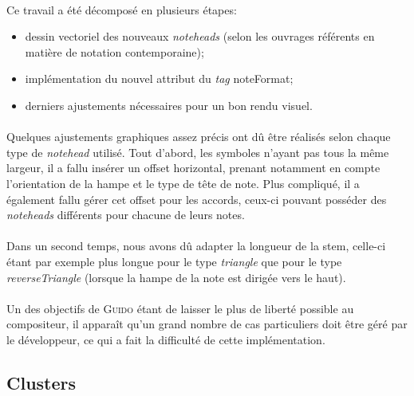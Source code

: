 \documentclass[a4paper,10pt,twocolumn]{article}
\newenvironment{code}
  {\fontfamily{pnc}\selectfont}{}
\begin{document}
\paragraph{}
Ce travail a été décomposé en plusieurs étapes:
\begin{itemize}
    \item dessin vectoriel des nouveaux \emph{noteheads} (selon les ouvrages référents en matière de notation contemporaine);
    \item implémentation du nouvel attribut du \emph{tag} \begin{code}noteFormat\end{code};
    \item derniers ajustements nécessaires pour un bon rendu visuel.
\end{itemize}

\paragraph{}
Quelques ajustements graphiques assez précis ont dû être réalisés selon chaque type de \emph{notehead} utilisé. Tout d'abord, les symboles n'ayant pas tous la même largeur, il a fallu insérer un offset horizontal, prenant notamment en compte l'orientation de la hampe et le type de tête de note. Plus compliqué, il a également fallu gérer cet offset pour les accords, ceux-ci pouvant posséder des \emph{noteheads} différents pour chacune de leurs notes.

\paragraph{}
Dans un second temps, nous avons dû adapter la longueur de la stem, celle-ci étant par exemple plus longue pour le type \emph{triangle} que pour le type \emph{reverseTriangle} (lorsque la hampe de la note est dirigée vers le haut).

\paragraph{}
Un des objectifs de \textsc{Guido} étant de laisser le plus de liberté possible au compositeur, il apparaît qu'un grand nombre de cas particuliers doit être géré par le développeur, ce qui a fait la difficulté de cette implémentation.

\subsection{Clusters}
\end{document}
